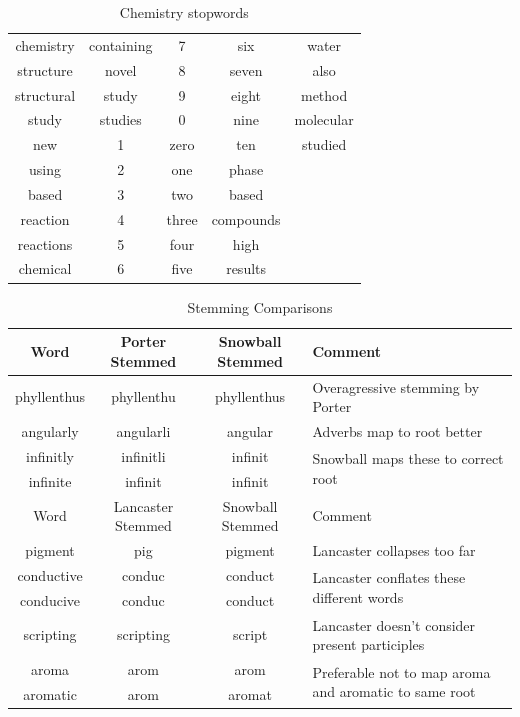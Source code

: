 \begin{table}[H]
\begin{center}
\caption{Chemistry stopwords}
\label{tab:CHEMSTOP}
\begin{tabular}{||c|c|c|c|c||}
\hline
chemistry & containing & 7 & six & water\\
structure & novel & 8 & seven & also\\
structural & study & 9 & eight & method\\
study & studies & 0 & nine & molecular\\
new & 1 & zero & ten & studied\\
using & 2 & one & phase& \\
based & 3 & two & based& \\
reaction & 4 & three & compounds & \\
reactions & 5 & four & high & \\
chemical & 6 & five & results & \\
\hline

\end{tabular}
\end{center}
\end{table}
\newpage
\addtocounter{page}{1}
\begin{table}[H]
\begin{center}
\caption{Stemming Comparisons}
\label{tab:stems}
\begin{tabular}{||c|c|c|p{5cm}||}
\hline
Word & Porter Stemmed & Snowball Stemmed & Comment\\
\hline     
phyllenthus & phyllenthu & phyllenthus & Overagressive stemming by Porter\\
\hline
angularly & angularli & angular & Adverbs map to root better\\
\hline
infinitly & infinitli & infinit & \multirow{2}{5cm}{Snowball maps these to correct root}\\
\cline{1-3}
infinite & infinit & infinit&\\
\hline
\hline
Word & Lancaster Stemmed & Snowball Stemmed & Comment\\
\hline
pigment & pig & pigment & Lancaster collapses too far\\
\hline
conductive & conduc & conduct & \multirow{2}{5cm}{Lancaster conflates these different words}\\
\cline{1-3}
conducive & conduc & conduct & \\
\hline
scripting & scripting & script & Lancaster doesn't consider present participles\\
\hline
aroma & arom & arom & \multirow{2}{5cm}{Preferable not to map aroma and aromatic to same root}\\
\cline{1-3}
aromatic & arom & aromat & \\
\hline
\end{tabular}
\end{center}
\end{table}

